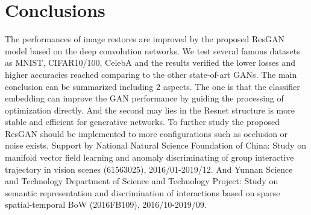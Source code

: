 \documentclass[publish,JACIII,paper]{jaciiiarticle}
\begin{document}
\section{Conclusions}
The performances of image restores are improved by the proposed ResGAN model based on the deep convolution networks.
We test several famous datasets as MNIST, CIFAR10/100, CelebA and the results verified the lower losses and higher accuracies reached comparing to the other state-of-art GANs.
The main conclusion can be summarized including 2 aspects.
The one is that the classifier embedding can improve the GAN performance by guiding the processing of optimization directly.
And the second may lies in the Resnet structure is more stable and efficient for generative networks.
To further study the proposed ResGAN should be implemented to more configurations such as occlusion or noise exists. 
\acknowledgements
Support by National Natural Science Foundation of China:
Study on manifold vector field learning and anomaly discriminating of group interactive trajectory in vision scenes (61563025), 2016/01-2019/12.
And Yunnan Science and Technology Department of Science and Technology Project:
Study on semantic representation and discrimination of interactions based on sparse spatial-temporal BoW (2016FB109), 2016/10-2019/09.

%







\end{document}

